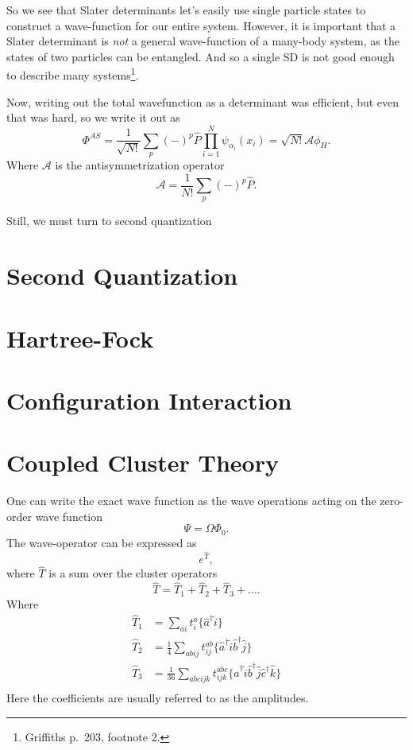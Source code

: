 \documentclass[a4paper, 11pt, notitlepage, english]{article}
\newcommand{\op}[1]{\hat{#1}}
\begin{document}
So we see that Slater determinants let's easily use single particle states to construct a wave-function for our entire system. However, it is important that a Slater determinant is \emph{not} a general wave-function of a many-body system, as the states of two particles can be entangled. And so a single SD is not good enough to describe many systems\footnote{Griffiths p.\ 203, footnote 2.}.

Now, writing out the total wavefunction as a determinant was efficient, but even that was hard, so we write it out as
$$\Phi^{AS} = \frac{1}{\sqrt{N!}} \sum_p (-)^p \op{P} \prod_{i=1}^N \psi_{\alpha_i}(x_i) = \sqrt{N!}\mathcal{A} \phi_H.$$
Where $\mathcal{A}$ is the antisymmetrization operator 
$$\mathcal{A} = \frac{1}{N!}\sum_p (-)^p \op{P}.$$

Still, we must turn to second quantization

\section*{Second Quantization}

\section*{Hartree-Fock}

\section*{Configuration Interaction}

\section*{Coupled Cluster Theory}

One can write the exact wave function as the wave operations acting on the zero-order wave function
$$\Psi = \Omega \Phi_0.$$
The wave-operator can be expressed as
$$e^{\op{T}},$$
where $\op{T}$ is a sum over the cluster operators
$$\op{T} = \op{T}_1 + \op{T}_2 + \op{T}_3 + \ldots.$$
Where
\begin{align*}
\op{T}_1 &= \sum_{ai}t_i^a \{\op{a}^\dagger \op{i}\} \\
\op{T}_2 &= \frac{1}{4}\sum_{abij}t_{ij}^{ab} \{\op{a}^\dagger \op{i} \op{b}^\dagger \op{j}\} \\
\op{T}_3 &= \frac{1}{36}\sum_{abcijk}t_{ijk}^{abc} \{\op{a}^\dagger \op{i} \op{b}^\dagger \op{j}\op{c}^\dagger \op{k}\} \\
\end{align*}
Here the coefficients are usually referred to as the amplitudes.
\end{document}
